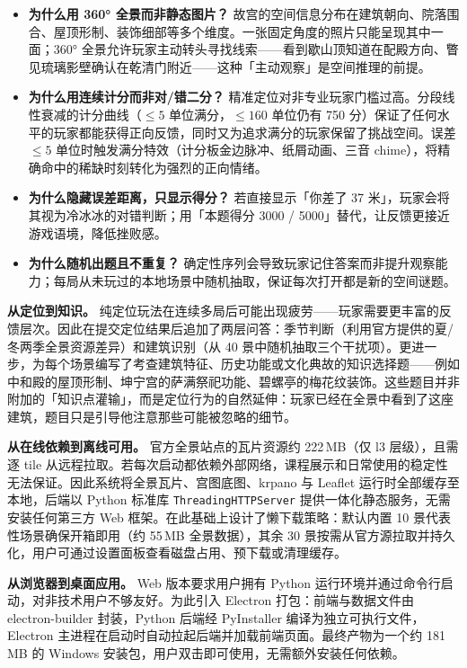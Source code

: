 \documentclass[UTF8,a4paper,12pt]{ctexart}
\begin{document}
\begin{itemize}[nosep]
  \item \textbf{为什么用 360° 全景而非静态图片？} 故宫的空间信息分布在建筑朝向、院落围合、屋顶形制、装饰细部等多个维度。一张固定角度的照片只能呈现其中一面；360° 全景允许玩家主动转头寻找线索——看到歇山顶知道在配殿方向、瞥见琉璃影壁确认在乾清门附近——这种「主动观察」是空间推理的前提。
  \item \textbf{为什么用连续计分而非对/错二分？} 精准定位对非专业玩家门槛过高。分段线性衰减的计分曲线（$\le 5$ 单位满分，$\le 160$ 单位仍有 750 分）保证了任何水平的玩家都能获得正向反馈，同时又为追求满分的玩家保留了挑战空间。误差 $\le 5$ 单位时触发满分特效（计分板金边脉冲、纸屑动画、三音 chime），将精确命中的稀缺时刻转化为强烈的正向情绪。
  \item \textbf{为什么隐藏误差距离，只显示得分？} 若直接显示「你差了 37 米」，玩家会将其视为冷冰冰的对错判断；用「本题得分 3000 / 5000」替代，让反馈更接近游戏语境，降低挫败感。
  \item \textbf{为什么随机出题且不重复？} 确定性序列会导致玩家记住答案而非提升观察能力；每局从未玩过的本地场景中随机抽取，保证每次打开都是新的空间谜题。
\end{itemize}

\textbf{从定位到知识。} 纯定位玩法在连续多局后可能出现疲劳——玩家需要更丰富的反馈层次。因此在提交定位结果后追加了两层问答：季节判断（利用官方提供的夏/冬两季全景资源差异）和建筑识别（从 40 景中随机抽取三个干扰项）。更进一步，为每个场景编写了考查建筑特征、历史功能或文化典故的知识选择题——例如中和殿的屋顶形制、坤宁宫的萨满祭祀功能、碧螺亭的梅花纹装饰。这些题目并非附加的「知识点灌输」，而是定位行为的自然延伸：玩家已经在全景中看到了这座建筑，题目只是引导他注意那些可能被忽略的细节。

\textbf{从在线依赖到离线可用。} 官方全景站点的瓦片资源约 222\,MB（仅 l3 层级），且需逐 tile 从远程拉取。若每次启动都依赖外部网络，课程展示和日常使用的稳定性无法保证。因此系统将全景瓦片、宫图底图、krpano 与 Leaflet 运行时全部缓存至本地，后端以 Python 标准库 \texttt{ThreadingHTTPServer} 提供一体化静态服务，无需安装任何第三方 Web 框架。在此基础上设计了懒下载策略：默认内置 10 景代表性场景确保开箱即用（约 55\,MB 全景数据），其余 30 景按需从官方源拉取并持久化，用户可通过设置面板查看磁盘占用、预下载或清理缓存。

\textbf{从浏览器到桌面应用。} Web 版本要求用户拥有 Python 运行环境并通过命令行启动，对非技术用户不够友好。为此引入 Electron 打包：前端与数据文件由 electron-builder 封装，Python 后端经 PyInstaller 编译为独立可执行文件，Electron 主进程在启动时自动拉起后端并加载前端页面。最终产物为一个约 181\,MB 的 Windows 安装包，用户双击即可使用，无需额外安装任何依赖。
\end{document}
